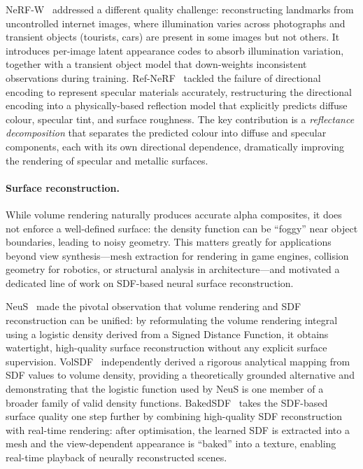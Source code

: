 NeRF-W~\citep{martinbrualla2021nerfw} addressed a different quality challenge:
reconstructing landmarks from uncontrolled internet images, where illumination
varies across photographs and transient objects (tourists, cars) are present in
some images but not others.
It introduces per-image latent appearance codes to absorb illumination variation,
together with a transient object model that down-weights inconsistent observations
during training.
Ref-NeRF~\citep{verbin2022refnerf} tackled the failure of directional encoding
to represent specular materials accurately, restructuring the directional
encoding into a physically-based reflection model that explicitly predicts
diffuse colour, specular tint, and surface roughness.
The key contribution is a \emph{reflectance decomposition} that separates the
predicted colour into diffuse and specular components, each with its own
directional dependence, dramatically improving the rendering of specular and
metallic surfaces.

\paragraph{Surface reconstruction.}
While volume rendering naturally produces accurate alpha composites, it does not
enforce a well-defined surface: the density function can be ``foggy'' near
object boundaries, leading to noisy geometry.
This matters greatly for applications beyond view synthesis---mesh extraction
for rendering in game engines, collision geometry for robotics, or structural
analysis in architecture---and motivated a dedicated line of work on
SDF-based neural surface reconstruction.

NeuS~\citep{wang2021neus} made the pivotal observation that volume rendering
and SDF reconstruction can be unified: by reformulating the volume rendering
integral using a logistic density derived from a Signed Distance Function,
it obtains watertight, high-quality surface reconstruction without any
explicit surface supervision.
VolSDF~\citep{yariv2021volsdf} independently derived a rigorous analytical
mapping from SDF values to volume density, providing a theoretically grounded
alternative and demonstrating that the logistic function used by NeuS is one
member of a broader family of valid density functions.
BakedSDF~\citep{yariv2023bakedsdf} takes the SDF-based surface quality one
step further by combining high-quality SDF reconstruction with real-time
rendering: after optimisation, the learned SDF is extracted into a mesh and
the view-dependent appearance is ``baked'' into a texture, enabling real-time
playback of neurally reconstructed scenes.

